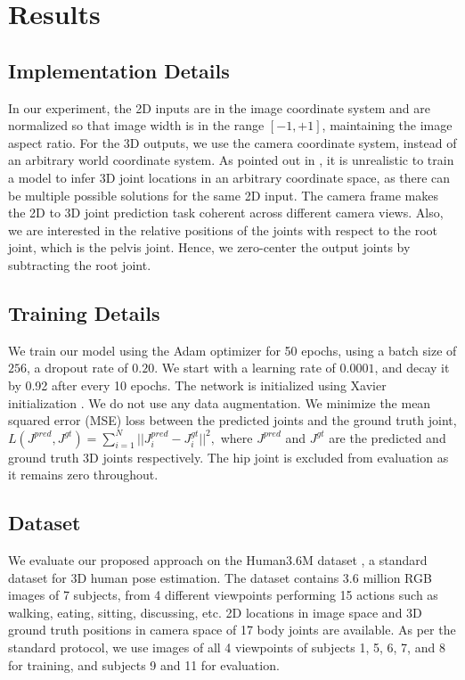 \documentclass{article}
\begin{document}
\section{Results}

\subsection{Implementation Details}
In our experiment, the 2D inputs are in the image coordinate system and are normalized so that image width is in the range $[-1,+1]$, maintaining the image aspect ratio.
For the 3D outputs, we use the camera coordinate system, instead of an arbitrary world coordinate system.
As pointed out in \cite{Martinez2017,Cai2019,Zhao2019}, it is unrealistic to train a model to infer 3D joint locations in an arbitrary coordinate space, as there can be multiple possible solutions for the same 2D input.
The camera frame makes the 2D to 3D joint prediction task coherent across different camera views.
Also, we are interested in the relative positions of the joints with respect to the root joint, which is the pelvis joint.
Hence, we zero-center the output joints by subtracting the root joint.

\subsection{Training Details}
We train our model using the Adam optimizer \cite{KingmaB14} for 50 epochs, using a batch size of $256$, a dropout rate of  $0.20$.
We start with a learning rate of $0.0001$, and decay it by 0.92 after every 10 epochs.
The network is initialized using Xavier initialization \cite{glorot2010understanding}. 
We do not use any data augmentation.
We minimize the mean squared error (MSE) loss between the predicted joints and the ground truth joint, $L(J^{pred}, J^{gt}) = \sum_{i=1}^{N} ||J^{pred}_i - J^{gt}_i||^2,$ where $J^{pred}$ and $J^{gt}$ are the predicted and ground truth 3D joints respectively.
The hip joint is excluded from evaluation as it remains zero throughout.

\subsection{Dataset}
We evaluate our proposed approach on the Human3.6M dataset \cite{ionescu2013human3}, a standard dataset for 3D human pose estimation.
The dataset contains 3.6 million RGB images of 7 subjects, from 4 different viewpoints performing 15 actions such as walking, eating, sitting, discussing, etc.
2D locations in image space and 3D ground truth positions in camera space of 17 body joints are available.
As per the standard protocol, we use images of all 4 viewpoints of subjects 1, 5, 6, 7, and 8 for training, and subjects 9 and 11 for evaluation.
\end{document}

